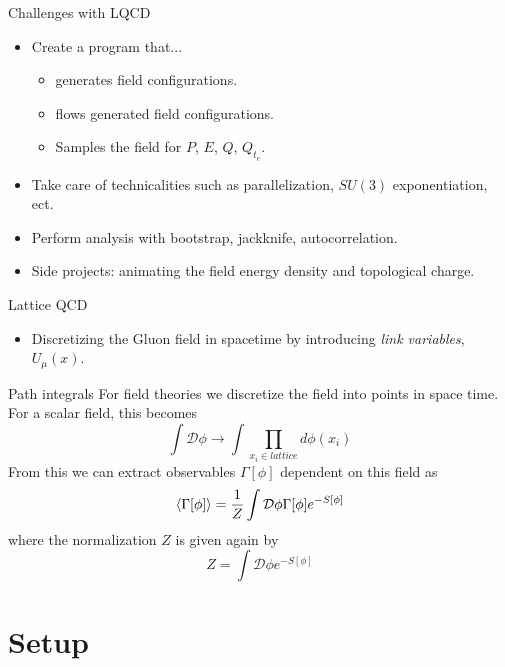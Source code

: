 \documentclass[10pt]{beamer}
\newcommand{\D}{\mathcal{D}}
\begin{document}
\begin{frame}{Challenges with LQCD}
	\begin{itemize}%
		\item Create a program that...
		\begin{itemize}%
			\item generates field configurations.
			\item flows generated field configurations.
			\item Samples the field for $P$, $E$, $Q$, $Q_{t_e}$.
		\end{itemize}
		\item Take care of technicalities such as parallelization, $SU(3)$ exponentiation, ect.
		\item Perform analysis with bootstrap, jackknife, autocorrelation.
		\item Side projects: animating the field energy density and topological charge.
	\end{itemize}
\end{frame}


\begin{frame}{Lattice QCD}
	\begin{itemize}%
		\item Discretizing the Gluon field in spacetime by introducing \textit{link variables}, $U_\mu(x)$.
	\end{itemize}
\end{frame}

\begin{frame}{Path integrals}
	For field theories we discretize the field into points in space time. For a scalar field, this becomes 
	\[
		 \int \D \phi \rightarrow \int \prod_{x_i \in lattice} d\phi(x_i)
	\]
	From this we can extract observables $\Gamma[\phi]$ dependent on this field as
	\[
		\braket{\Gamma[\phi]} = \frac{1}{Z} \int \D \phi \Gamma[\phi] e^{-S[\phi]}
	\]
	where the normalization $Z$ is given again by 
	\[
		Z = \int \D \phi e^{-S[\phi]}
	\]
\end{frame}

\section{Setup}
\end{document}
